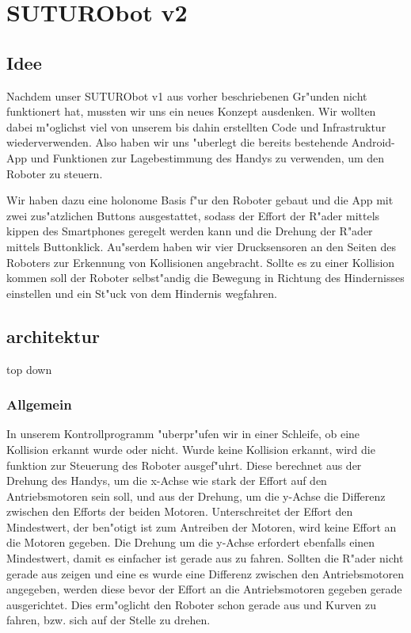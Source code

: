 \documentclass[8pt]{article}
\begin{document}
\section{SUTURObot v2}

\subsection{Idee}
Nachdem unser SUTURObot v1 aus vorher beschriebenen Gr"unden nicht funktionert hat, mussten wir uns ein neues Konzept ausdenken. Wir wollten dabei m"oglichst viel von unserem bis dahin erstellten Code und Infrastruktur wiederverwenden. Also haben wir uns "uberlegt die bereits bestehende Android-App und Funktionen zur Lagebestimmung des Handys zu verwenden, um den Roboter zu steuern.

Wir haben dazu eine holonome Basis f"ur den Roboter gebaut und die App mit zwei zus"atzlichen Buttons ausgestattet, sodass der Effort der R"ader mittels kippen des Smartphones geregelt werden kann und die Drehung der R"ader mittels Buttonklick. Au"serdem haben wir vier Drucksensoren an den Seiten des Roboters zur Erkennung von Kollisionen angebracht. Sollte es zu einer Kollision kommen soll der Roboter selbst"andig die Bewegung in Richtung des Hindernisses einstellen und ein St"uck von dem Hindernis wegfahren.

\subsection{architektur}
top down

\subsubsection{Allgemein}
In unserem Kontrollprogramm "uberpr"ufen wir in einer Schleife, ob eine Kollision erkannt wurde oder nicht. Wurde keine Kollision erkannt, wird die funktion zur Steuerung des Roboter ausgef"uhrt. Diese berechnet aus der Drehung des Handys, um die x-Achse wie stark der Effort auf den Antriebsmotoren sein soll, und aus der Drehung, um die y-Achse die Differenz zwischen den Efforts der beiden Motoren. Unterschreitet der Effort den Mindestwert, der ben"otigt ist zum Antreiben der Motoren, wird keine Effort an die Motoren gegeben. Die Drehung um die y-Achse erfordert ebenfalls einen Mindestwert, damit es einfacher ist gerade aus zu fahren. Sollten die R"ader nicht gerade aus zeigen und eine es wurde eine Differenz zwischen den Antriebsmotoren angegeben, werden diese bevor der Effort an die Antriebsmotoren gegeben gerade ausgerichtet. Dies erm"oglicht den Roboter schon gerade aus und Kurven zu fahren, bzw. sich auf der Stelle zu drehen.
\end{document}
